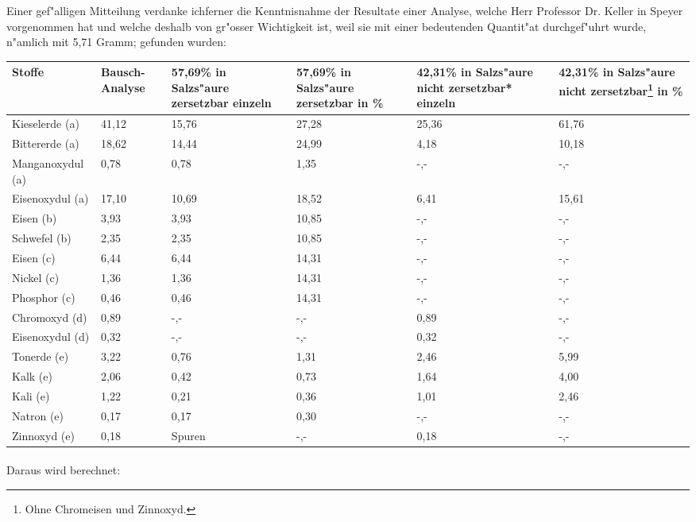 \documentclass[a4paper, 11pt, oneside]{article}
\begin{document}
Einer gef"alligen Mitteilung verdanke ichferner die Kenntnisnahme der Resultate einer Analyse, welche Herr Professor Dr. Keller in Speyer vorgenommen hat und welche deshalb von gr"osser Wichtigkeit ist, weil sie mit einer bedeutenden Quantit"at durchgef"uhrt wurde, n"amlich mit 5,71 Gramm; gefunden wurden:
\begin{center}
    \begin{tabular}{ |p{30mm}|p{14mm}|p{14mm}|p{14mm}|p{14mm}|p{14mm}| }
    \hline
    Stoffe & Bausch-Analyse & 57,69\% in Salzs"aure zersetzbar einzeln & 57,69\% in Salzs"aure zersetzbar in \% & 42,31\% in Salzs"aure nicht zersetzbar* einzeln & 42,31\% in Salzs"aure nicht zersetzbar\footnote{Ohne Chromeisen und Zinnoxyd.} in \%\\
    \hline\hline
    Kieselerde (a) & 41,12 & 15,76 & 27,28 & 25,36 & 61,76\\\hline
    Bittererde (a) & 18,62 & 14,44 & 24,99 & 4,18 & 10,18\\\hline
    Manganoxydul (a) & 0,78 & 0,78 & 1,35 & -,- & -,-\\\hline
    Eisenoxydul (a) & 17,10 & 10,69 & 18,52 & 6,41 & 15,61\\\hline
    Eisen (b) & 3,93 & 3,93 & 10,85 & -,- & -,-\\\hline
    Schwefel (b) & 2,35 & 2,35 & 10,85 & -,- & -,-\\\hline
    Eisen (c) & 6,44 & 6,44 & 14,31 & -,- & -,-\\\hline
    Nickel (c) & 1,36 & 1,36 & 14,31 & -,- & -,-\\\hline
    Phosphor (c) & 0,46 & 0,46 & 14,31 & -,- & -,-\\\hline
    Chromoxyd (d) & 0,89 & -,- & -,- & 0,89 & -,-\\\hline
    Eisenoxydul (d) & 0,32 & -,- & -,- & 0,32 & -,-\\\hline
    Tonerde (e) & 3,22 & 0,76 & 1,31 & 2,46 & 5,99\\\hline
    Kalk (e) & 2,06 & 0,42 & 0,73 & 1,64 & 4,00\\\hline
    Kali (e) & 1,22 & 0,21 & 0,36 & 1,01 & 2,46\\\hline
    Natron (e) & 0,17 & 0,17 & 0,30 & -,- & -,-\\\hline
    Zinnoxyd (e) & 0,18 & Spuren & -,- & 0,18 & -,-\\
    \hline
    \end{tabular}
\end{center}
\paragraph{}
Daraus wird berechnet:
\end{document}
